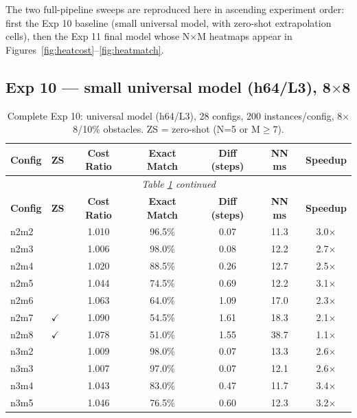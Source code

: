 \documentclass[11pt,a4paper]{article}
\begin{document}
The two full-pipeline sweeps are reproduced here in ascending experiment order: first the
Exp 10 baseline (small universal model, with zero-shot extrapolation cells), then the Exp 11
final model whose N$\times$M heatmaps appear in Figures~\ref{fig:heatcost}--\ref{fig:heatmatch}.

\subsection{Exp 10 --- small universal model (h64/L3), 8$\times$8}

\begin{longtable}{llccccc}
\caption{Complete Exp 10: universal model (h64/L3), 28 configs, 200 instances/config,
8$\times$8/10\% obstacles. ZS = zero-shot (N=5 or M$\geq$7).}
\label{tab:fullpipe10} \\
\toprule
\textbf{Config} & \textbf{ZS} & \textbf{Cost Ratio} & \textbf{Exact Match} &
  \textbf{Diff (steps)} & \textbf{NN ms} & \textbf{Speedup} \\
\midrule
\endfirsthead
\multicolumn{7}{c}{\small\textit{Table \ref{tab:fullpipe10} continued}} \\[4pt]
\toprule
\textbf{Config} & \textbf{ZS} & \textbf{Cost Ratio} & \textbf{Exact Match} &
  \textbf{Diff (steps)} & \textbf{NN ms} & \textbf{Speedup} \\
\midrule
\endhead
\bottomrule
\endfoot
n2m2 &              & 1.010 & 96.5\% & 0.07 & 11.3 & 3.0$\times$ \\
n2m3 &              & 1.006 & 98.0\% & 0.08 & 12.2 & 2.7$\times$ \\
n2m4 &              & 1.020 & 88.5\% & 0.26 & 12.7 & 2.5$\times$ \\
n2m5 &              & 1.044 & 74.5\% & 0.69 & 12.2 & 3.1$\times$ \\
n2m6 &              & 1.063 & 64.0\% & 1.09 & 17.0 & 2.3$\times$ \\
n2m7 & $\checkmark$ & 1.090 & 54.5\% & 1.61 & 18.3 & 2.1$\times$ \\
n2m8 & $\checkmark$ & 1.078 & 51.0\% & 1.55 & 38.7 & 1.1$\times$ \\
n3m2 &              & 1.009 & 98.0\% & 0.07 & 13.3 & 2.6$\times$ \\
n3m3 &              & 1.007 & 97.0\% & 0.07 & 12.1 & 2.6$\times$ \\
n3m4 &              & 1.043 & 83.0\% & 0.47 & 11.7 & 3.4$\times$ \\
n3m5 &              & 1.046 & 76.5\% & 0.60 & 12.3 & 3.2$\times$ \\

\end{longtable}
\end{document}
